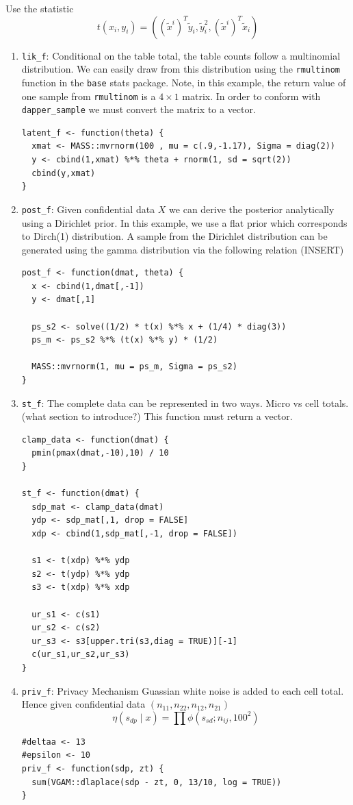 Use the statistic
\[
t(x_i,y_i) = ((\tilde{x}^{i})^T \tilde{y}_i, \tilde{y}_i^2, (\tilde{x}^{i})^T \tilde{x}_i)
\]

\begin{enumerate}
\def\labelenumi{\arabic{enumi}.}
\item
  \texttt{lik\_f}: Conditional on the table total, the table counts follow a multinomial
  distribution. We can easily draw from this distribution using the
  \texttt{rmultinom} function in the \texttt{base} stats package. Note, in this example,
  the return value of one sample from \texttt{rmultinom} is a \(4 \times 1\) matrix. In order to
  conform with \texttt{dapper\_sample} we must convert the matrix to a vector.

\begin{verbatim}
latent_f <- function(theta) {
  xmat <- MASS::mvrnorm(100 , mu = c(.9,-1.17), Sigma = diag(2))
  y <- cbind(1,xmat) %*% theta + rnorm(1, sd = sqrt(2))
  cbind(y,xmat)
}
\end{verbatim}
\item
  \texttt{post\_f}: Given confidential data \(X\) we can derive the posterior analytically
  using a Dirichlet prior. In this example, we use a flat prior which
  corresponds to Dirch(1) distribution. A sample from the Dirichlet distribution
  can be generated using the gamma distribution via the following relation (INSERT)

\begin{verbatim}
post_f <- function(dmat, theta) {
  x <- cbind(1,dmat[,-1])
  y <- dmat[,1]

  ps_s2 <- solve((1/2) * t(x) %*% x + (1/4) * diag(3))
  ps_m <- ps_s2 %*% (t(x) %*% y) * (1/2)

  MASS::mvrnorm(1, mu = ps_m, Sigma = ps_s2)
}
\end{verbatim}
\item
  \texttt{st\_f}: The complete data can be represented in two ways. Micro vs cell totals.
  (what section to introduce?) This function must return a vector.

\begin{verbatim}
clamp_data <- function(dmat) {
  pmin(pmax(dmat,-10),10) / 10
}

st_f <- function(dmat) {
  sdp_mat <- clamp_data(dmat)
  ydp <- sdp_mat[,1, drop = FALSE]
  xdp <- cbind(1,sdp_mat[,-1, drop = FALSE])

  s1 <- t(xdp) %*% ydp
  s2 <- t(ydp) %*% ydp
  s3 <- t(xdp) %*% xdp

  ur_s1 <- c(s1)
  ur_s2 <- c(s2)
  ur_s3 <- s3[upper.tri(s3,diag = TRUE)][-1]
  c(ur_s1,ur_s2,ur_s3)
}
\end{verbatim}
\item
  \texttt{priv\_f}: Privacy Mechanism
  Guassian white noise is added to each cell total. Hence given
  confidential data \((n_{11}, n_{22}, n_{12}, n_{21})\)
  \[
  \eta(s_{dp} \mid x) = \prod \phi(s_{sd}; n_{ij}, 100^2)
  \]

\begin{verbatim}
#deltaa <- 13
#epsilon <- 10
priv_f <- function(sdp, zt) {
  sum(VGAM::dlaplace(sdp - zt, 0, 13/10, log = TRUE))
}
\end{verbatim}
\end{enumerate}

